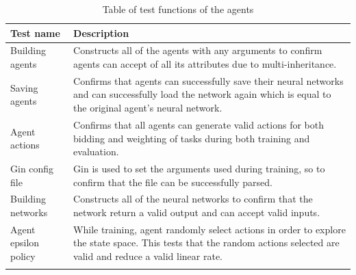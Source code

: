 \begin{longtable}{|p{3cm}|p{11cm}|} \hline
    \textbf{Test name} & \textbf{Description} \\ \hline
    Building agents & Constructs all of the agents with any arguments to confirm agents can accept of all its
        attributes due to multi-inheritance. \\ \hline
    Saving agents & Confirms that agents can successfully save their neural networks and can successfully load
        the network again which is equal to the original agent's neural network. \\ \hline
    Agent actions & Confirms that all agents can generate valid actions for both bidding and weighting of tasks during
        both training and evaluation. \\ \hline
    Gin config file & Gin is used to set the arguments used during training, so to confirm that the file can be
        successfully parsed. \\ \hline
    Building networks & Constructs all of the neural networks to confirm that the network return a valid output
        and can accept valid inputs. \\ \hline
    Agent epsilon policy & While training, agent randomly select actions in order to explore the state space.
        This tests that the random actions selected are valid and reduce a valid linear rate. \\ \hline
    \caption{Table of test functions of the agents}
    \label{tab:agent_testing}
\end{longtable}

